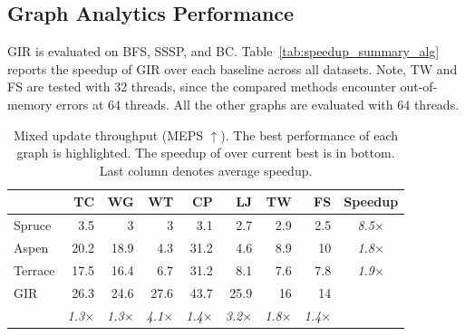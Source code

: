 
\subsection{Graph Analytics Performance}
GIR is evaluated on BFS, SSSP, and BC.
Table~\ref{tab:speedup_summary_alg} reports the speedup of GIR over each baseline across all datasets.
Note, TW and FS are tested with 32 threads, since the compared methods encounter out-of-memory errors at 64 threads. All the other graphs are evaluated with 64 threads.

\begin{table}[t]
\centering
\setlength{\tabcolsep}{4pt}
\caption{Mixed update throughput (MEPS $\uparrow$).
The best performance of each graph is highlighted. The speedup of {\name} over current best is in bottom. Last column denotes average speedup.
\protect{}}
\label{tab:throughput_summary}
\begin{tabular}{l r r r r r r r c}
\toprule
 & \textbf{TC} & \textbf{WG} & \textbf{WT} & \textbf{CP} & \textbf{LJ} & \textbf{TW} & \textbf{FS} & \textbf{Speedup} \\
\midrule
Spruce  &   3.5  &   3  &   3  &   3.1  &   2.7  &   2.9  &   2.5  &   \textit{8.5}$\times$  \\
Aspen   &  20.2  &  18.9  &   4.3  &  31.2  &   4.6  &   8.9  &  10  &   \textit{1.8}$\times$  \\
Terrace &  17.5  &  16.4  &   6.7  &  31.2  &   8.1  &   7.6  &   7.8  &   \textit{1.9}$\times$  \\
GIR     &  \cellcolor[HTML]{CBCEFB}26.3  &  \cellcolor[HTML]{CBCEFB}24.6  &  \cellcolor[HTML]{CBCEFB}27.6  &  \cellcolor[HTML]{CBCEFB}43.7  &  \cellcolor[HTML]{CBCEFB}25.9  &  \cellcolor[HTML]{CBCEFB}16  &  \cellcolor[HTML]{CBCEFB}14  &        \\
        & \textit{1.3}$\times$ & \textit{1.3}$\times$ & \textit{4.1}$\times$ & \textit{1.4}$\times$ & \textit{3.2}$\times$ & \textit{1.8}$\times$ & \textit{1.4}$\times$ &        \\
\bottomrule
\end{tabular}
\end{table}



